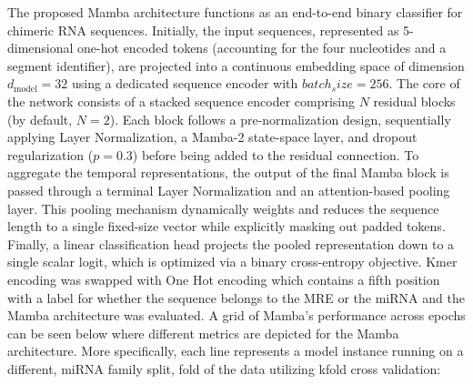 \documentclass[en,ack]{dimscthesis}
\begin{document}
 The proposed Mamba architecture functions as an end-to-end binary classifier for chimeric RNA sequences. Initially, the input sequences, represented as 5-dimensional one-hot encoded tokens (accounting for the four nucleotides and a segment identifier), are projected into a continuous embedding space of dimension $d_{\text{model}} = 32$ using a dedicated sequence encoder with $batch_size=256$. The core of the network consists of a stacked sequence encoder comprising $N$ residual blocks (by default, $N=2$). Each block follows a pre-normalization design, sequentially applying Layer Normalization, a Mamba-2 state-space layer, and dropout regularization ($p=0.3$) before being added to the residual connection. To aggregate the temporal representations, the output of the final Mamba block is passed through a terminal Layer Normalization and an attention-based pooling layer. This pooling mechanism dynamically weights and reduces the sequence length to a single fixed-size vector while explicitly masking out padded tokens. Finally, a linear classification head projects the pooled representation down to a single scalar logit, which is optimized via a binary cross-entropy objective. Kmer encoding was swapped with One Hot encoding which contains a fifth position with a label for whether the sequence belongs to the MRE or the miRNA and the Mamba architecture was evaluated. A grid of Mamba's performance across epochs can be seen below where different metrics are depicted for the Mamba architecture. More specifically, each line represents a model instance running on a different, miRNA family split, fold of the data utilizing kfold cross validation:
\end{document}
